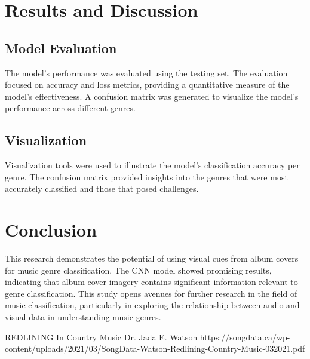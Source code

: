 \documentclass[12pt]{article}
\begin{document}
\section{Results and Discussion}
\subsection{Model Evaluation}
The model's performance was evaluated using the testing set. The evaluation focused on accuracy and loss metrics, providing a quantitative measure of the model's effectiveness. A confusion matrix was generated to visualize the model's performance across different genres.

\subsection{Visualization}
Visualization tools were used to illustrate the model's classification accuracy per genre. The confusion matrix provided insights into the genres that were most accurately classified and those that posed challenges.

\section{Conclusion}
This research demonstrates the potential of using visual cues from album covers for music genre classification. The CNN model showed promising results, indicating that album cover imagery contains significant information relevant to genre classification. This study opens avenues for further research in the field of music classification, particularly in exploring the relationship between audio and visual data in understanding music genres.

REDLINING In Country Music
Dr. Jada E. Watson
https://songdata.ca/wp-content/uploads/2021/03/SongData-Watson-Redlining-Country-Music-032021.pdf
\end{document}
